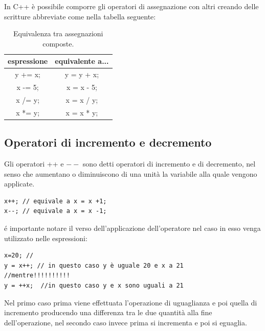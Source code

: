 \documentclass[11pt,fleqn]{book} %
\begin{document}
In C++ è possibile comporre gli operatori di assegnazione con altri creando delle scritture abbreviate come nella tabella seguente:
\begin{table}[h]
\centering
\begin{tabular}{c|c}
espressione	& equivalente a...\\
\hline
y += x; &	y = y + x;\\
\hline
x -= 5;	& x = x - 5;\\
\hline
x /= y;	& x = x / y;\\
\hline
x *= y;	& x = x * y;\\
\end{tabular}
\caption{Equivalenza tra assegnazioni composte. \label{tab2}}
\end{table}
\subsection{Operatori di incremento e decremento}

Gli operatori ++ e $--$ sono detti operatori di incremento e di decremento, nel senso che aumentano o diminuiscono di una unità la variabile alla quale vengono applicate.
\begin{verbatim}
x++; // equivale a x = x +1;
x--; // equivale a x = x -1;
\end{verbatim}
é importante notare il verso dell'applicazione dell'operatore nel caso in esso venga utilizzato nelle espressioni:
\begin{verbatim}
x=20; // 
y = x++; // in questo caso y è uguale 20 e x a 21
//mentre!!!!!!!!!!
y = ++x;  //in questo caso y e x sono uguali a 21
\end{verbatim}

Nel primo caso prima viene effettuata l'operazione di uguaglianza e poi quella di incremento producendo una differenza tra le due quantità alla fine dell'operazione, nel secondo caso invece prima si incrementa e poi si eguaglia.
\end{document}

